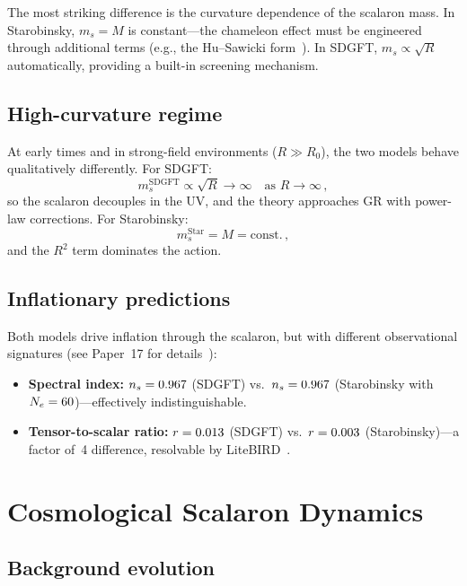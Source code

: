 \documentclass[amsmath,amssymb,aps,prd,twocolumn,superscriptaddress,nofootinbib]{revtex4-2}
\begin{document}
The most striking difference is the curvature dependence of the
scalaron mass.  In Starobinsky, $m_s = M$ is constant---the
chameleon effect must be engineered through additional terms
(e.g., the Hu--Sawicki
form~\cite{Hu2007}).  In SDGFT, $m_s \propto \sqrt{R}$
automatically, providing a built-in screening mechanism.

\subsection{High-curvature regime}

At early times and in strong-field environments ($R \gg R_0$),
the two models behave qualitatively differently.
For SDGFT:
\begin{equation}
  m_s^{\mathrm{SDGFT}} \propto \sqrt{R} \to \infty
  \quad \text{as } R \to \infty\,,
  \label{eq:ms_highR_sdgft}
\end{equation}
so the scalaron decouples in the UV, and the theory approaches
GR with power-law corrections.  For Starobinsky:
\begin{equation}
  m_s^{\mathrm{Star}} = M = \mathrm{const.}\,,
  \label{eq:ms_highR_star}
\end{equation}
and the $R^2$ term dominates the action.

\subsection{Inflationary predictions}

Both models drive inflation through the scalaron, but with
different observational signatures (see Paper~17 for
details~\cite{Besemer_Paper17}):
\begin{itemize}
  \item \textbf{Spectral index:} $n_s = 0.967$ (SDGFT) vs.\
    $n_s = 0.967$ (Starobinsky with $N_e = 60$)---effectively
    indistinguishable.
  \item \textbf{Tensor-to-scalar ratio:} $r = 0.013$ (SDGFT)
    vs.\ $r = 0.003$ (Starobinsky)---a factor of~4 difference,
    resolvable by LiteBIRD~\cite{LiteBIRD2023}.
\end{itemize}

\section{Cosmological Scalaron Dynamics}
\label{sec:cosmological}

\subsection{Background evolution}
\end{document}
